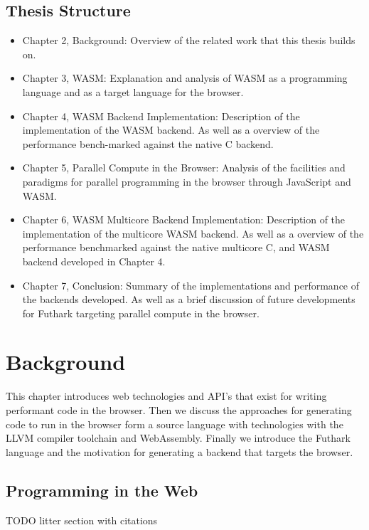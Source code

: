 \documentclass[11pt]{book}
\begin{document}
\section{Thesis Structure}
\begin{itemize}
    \item Chapter 2, Background:
    Overview of the related work that this thesis builds on.
    \item Chapter 3, WASM:
    Explanation and analysis of WASM as a programming language and as a target language for the browser. 
    
    \item Chapter 4, WASM  Backend Implementation:
     Description of the implementation of the WASM backend. As well as a overview of the performance bench-marked against the native C backend.
    
    \item Chapter 5, Parallel Compute in the Browser:
    Analysis of the facilities and paradigms for parallel programming in the browser through JavaScript and WASM. 
    
    \item Chapter 6, WASM Multicore Backend Implementation:
    Description of the implementation of the multicore WASM backend. As well as a overview of the performance benchmarked against the native multicore C, and WASM backend developed in Chapter 4.
    
    \item Chapter 7, Conclusion:
    Summary of the implementations and performance of the backends developed. As well as a brief discussion of future developments for Futhark targeting parallel compute in the browser.
    
\end{itemize}
\chapter{Background}

This chapter introduces web technologies and API's that exist for writing performant code in the browser. Then we discuss the approaches for generating code to run in the browser form a source language with technologies with the LLVM compiler toolchain and WebAssembly. Finally we introduce the Futhark language and the motivation for generating a backend that targets the browser.

\section{Programming in the Web}
TODO litter section with citations
\end{document}
